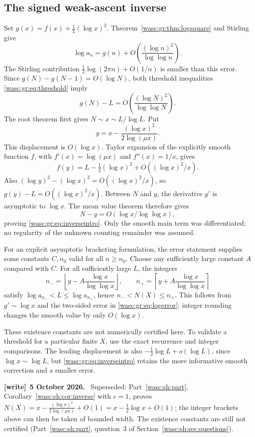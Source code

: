 \documentclass[11pt,a4paper]{article}
\theoremstyle{remark}\newtheorem{remark}[theorem]{Remark}
\numberwithin{equation}{section}
\newenvironment{writenote}[1][]{\par\smallskip\begingroup\small
 \noindent\textbf{[write]}\if\relax\detokenize{#1}\relax\else~\textbf{#1.}\fi\ }%
 {\par\endgroup\smallskip}
\begin{document}
\subsection{The signed weak-ascent inverse}
Set $g(x)=f(x)+\tfrac12(\log x)^2$. Theorem~\ref{wasc:gr:thm:logsquare} and Stirling give
\begin{equation}\label{wasc:gr:eq:logerror}
\log a_n=g(n)+O\!\left(\frac{(\log n)^2}{\log\log n}\right).
\end{equation}
The Stirling contribution $\tfrac12\log(2\pi n)+O(1/n)$ is smaller than this error. Since $g(N)-g(N-1)=O(\log N)$, both threshold inequalities \eqref{wasc:gr:eq:threshold} imply
\[
g(N)-L=O\!\left(\frac{(\log N)^2}{\log\log N}\right).
\]
The root theorem first gives $N\sim x\sim L/\log L$. Put
\begin{equation}\label{wasc:gr:eq:newtonstart}
y=x-\frac{(\log x)^2}{2\log(\mu x)}.
\end{equation}
This displacement is $O(\log x)$. Taylor expansion of the explicitly smooth function $f$, with $f'(x)=\log(\mu x)$ and $f''(x)=1/x$, gives
\[
f(y)=L-\tfrac12(\log x)^2+O((\log x)^2/x).
\]
Also $(\log y)^2-(\log x)^2=O((\log x)^2/x)$, so $g(y)-L=O((\log x)^2/x)$. Between $N$ and $y$, the derivative $g'$ is asymptotic to $\log x$. The mean value theorem therefore gives
\[
N-y=O(\log x/\log\log x),
\]
proving \eqref{wasc:gr:eq:inverseintro}. Only the smooth main term was differentiated; no regularity of the unknown counting remainder was assumed.

For an explicit asymptotic bracketing formulation, the error statement supplies some constants $C,n_0$ valid for all $n\ge n_0$. Choose any sufficiently large constant $A$ compared with $C$. For all sufficiently large $L$, the integers
\[
n_- =\left\lfloor y-A\frac{\log x}{\log\log x}\right\rfloor,
\qquad
n_+ =\left\lceil y+A\frac{\log x}{\log\log x}\right\rceil
\]
satisfy $\log a_{n_-}<L\le\log a_{n_+}$, hence $n_-<N(X)\le n_+$. This follows from $g'\sim\log x$ and the two-sided error in \eqref{wasc:gr:eq:logerror}; integer rounding changes the smooth value by only $O(\log x)$.

These existence constants are not numerically certified here. To validate a threshold for a particular finite $X$, use the exact recurrence and integer comparisons. The leading displacement is also $-\tfrac12\log L+o(\log L)$, since $\log x\sim\log L$, but \eqref{wasc:gr:eq:inverseintro} retains the more informative smooth correction and a smaller error.
\begin{writenote}[5 October 2026]
Superseded: Part~\ref{wasc:sh:part}, Corollary~\ref{wasc:sh:cor:inverse} with $c=1$, proves $N(X)=x-\frac{(\log x)^2}{2\log(\mu x)}+O(1)=x-\frac12\log x+O(1)$; the integer brackets above can then be taken of bounded width. The existence constants are still not certified (Part~\ref{wasc:sh:part}, question~3 of Section~\ref{wasc:sh:sec:questions}).
\end{writenote}
\end{document}
